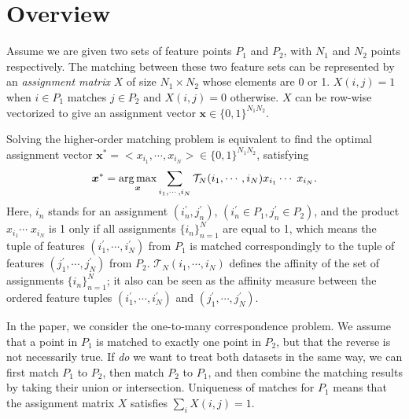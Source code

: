 \section{Overview}
\label{sec:overview}

Assume we are given two sets of feature points $P_1$ and $P_2$, with $N_1$  and $N_2$ points respectively.
The matching between these two feature sets can be represented by an \emph{assignment matrix} $X$ of size $N_1 \times N_2$ whose elements are 0 or 1.
$X(i,j)=1$ when $i \in P_1$ matches $j \in P_2$ and $X(i,j)=0$ otherwise. $X$ can be row-wise vectorized to give an assignment vector $\boldsymbol{x} \in \{0,1\}^{N_1N_2}$.

Solving the higher-order matching problem is equivalent to find the optimal assignment vector ${\boldsymbol{x}}^*=<x_{i_1},\cdots,x_{i_N}> \in \{0,1\}^{N_1N_2}$, satisfying
\begin{equation}
\label{equ:assigment}
  {\boldsymbol{x}}^* = \operatorname*{arg\,max}_{\boldsymbol{x}}  \sum_{i_1,\cdots,i_N} \mathcal{T}_N(i_1,\cdots,i_N) x_{i_1}  \cdots\; x_{i_N}.
\end{equation}
Here, $i_n$ stands for an assignment $(i^{'}_n,j^{'}_n)$, $(i^{'}_n\in P_1,j^{'}_n\in P_2)$, and the
product $x_{i_1}  \cdots\;x_{i_N}$ is 1 only if all assignments $\{i_n\}_{n=1}^N$ are equal to 1, which means the tuple of features $(i^{'}_1,\cdots,i^{'}_N)$ from $P_1$ is matched correspondingly to the tuple of features $(j^{'}_1,\cdots,j^{'}_N)$ from $P_2$.
$\mathcal{T}_N(i_1,\cdots,i_N)$ defines the affinity of the set of assignments $\{i_n\}_{n=1}^N$;
it also can be seen as the affinity measure between the ordered feature tuples $(i^{'}_1,\cdots,i^{'}_N)$  and $(j^{'}_1,\cdots,j^{'}_N)$.

In the paper, we consider the one-to-many correspondence problem.
We assume that a point in $P_1$ is matched to exactly one point in $P_2$, but that the reverse is not necessarily true.
If \emph{do} we want to treat both datasets in the same way,
we can first match $P_1$ to $P_2$, then match $P_2$ to $P_1$, and then combine the matching results by taking their union or intersection.
Uniqueness of matches for $P_1$ means that the assignment matrix $X$ satisfies $\sum\nolimits_i X(i,j)=1$.

